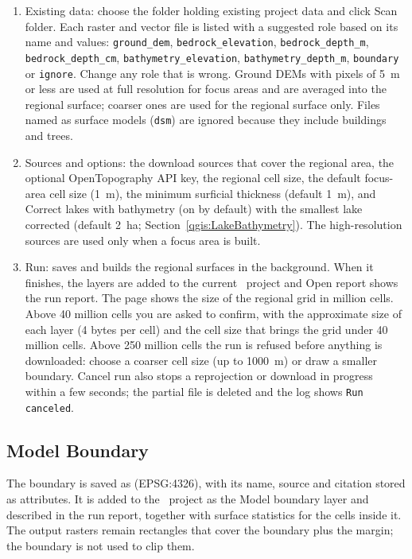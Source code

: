 \begin{enumerate}
        \item {\sf Existing data}: choose the folder holding existing project data and click {\sf Scan folder}.  Each raster and vector file is listed with a suggested role based on its name and values: {\tt ground\_dem}, {\tt bedrock\_elevation}, {\tt bedrock\_depth\_m}, {\tt bedrock\_depth\_cm}, {\tt bathymetry\_elevation}, {\tt bathymetry\_depth\_m}, {\tt boundary} or {\tt ignore}.  Change any role that is wrong.  Ground DEMs with pixels of 5~m or less are used at full resolution for focus areas and are averaged into the regional surface; coarser ones are used for the regional surface only.  Files named as surface models ({\tt dsm}) are ignored because they include buildings and trees.
        \item {\sf Sources and options}: the download sources that cover the regional area, the optional OpenTopography API key, the regional cell size, the default focus-area cell size (1~m), the minimum surficial thickness (default 1~m), and {\sf Correct lakes with bathymetry} (on by default) with the smallest lake corrected (default 2~ha; Section~\ref{qgis:LakeBathymetry}).  The high-resolution sources are used only when a focus area is built.
        \item {\sf Run}: saves  and builds the regional surfaces in the background.  When it finishes, the layers are added to the current \qgis\ project and {\sf Open report} shows the run report.  The page shows the size of the regional grid in million cells.  Above 40 million cells you are asked to confirm, with the approximate size of each layer (4 bytes per cell) and the cell size that brings the grid under 40 million cells.  Above 250 million cells the run is refused before anything is downloaded: choose a coarser cell size (up to 1000~m) or draw a smaller boundary.  {\sf Cancel run} also stops a reprojection or download in progress within a few seconds; the partial file is deleted and the log shows {\tt Run canceled}.
        \end{enumerate}

    \subsection{Model Boundary}
        \label{qgis:ModelBoundary} 
        The boundary is saved as  (EPSG:4326), with its name, source and citation stored as attributes.  It is added to the \qgis\ project as the {\sf Model boundary} layer and described in the run report, together with surface statistics for the cells inside it.  The output rasters remain rectangles that cover the boundary plus the margin; the boundary is not used to clip them.

